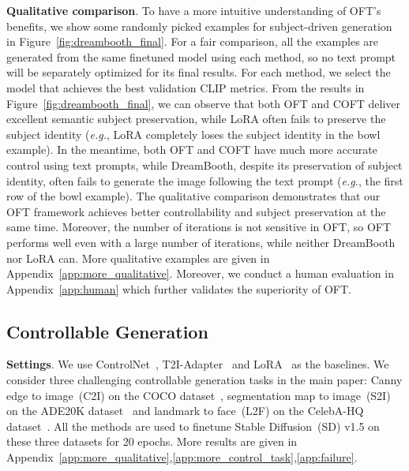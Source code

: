 \textbf{Qualitative comparison}. To have a more intuitive understanding of OFT's benefits, we show some randomly picked examples for subject-driven generation in Figure~\ref{fig:dreambooth_final}. For a fair comparison, all the examples are generated from the same finetuned model using each method, so no text prompt will be separately optimized for its final results. For each method, we select the model that achieves the best validation CLIP metrics. From the results in Figure~\ref{fig:dreambooth_final}, we can observe that both OFT and COFT deliver excellent semantic subject preservation, while LoRA often fails to preserve the subject identity (\emph{e.g.}, LoRA completely loses the subject identity in the bowl example). In the meantime, both OFT and COFT have much more accurate control using text prompts, while DreamBooth, despite its preservation of subject identity, often fails to generate the image following the text prompt (\emph{e.g.}, the first row of the bowl example). The qualitative comparison demonstrates that our OFT framework achieves better controllability and subject preservation at the same time. Moreover, the number of iterations is not sensitive in OFT, so OFT performs well even with a large number of iterations, while neither DreamBooth nor LoRA can. More qualitative examples are given in Appendix~\ref{app:more_qualitative}. Moreover, we conduct a human evaluation in Appendix~\ref{app:human} which further validates the superiority of OFT.

\subsection{Controllable Generation}

\textbf{Settings}. We use ControlNet~\cite{zhang2023adding}, T2I-Adapter~\cite{mou2023t2i} and LoRA~\cite{hulora2022} as the baselines. We consider three challenging controllable generation tasks in the main paper: Canny edge to image~(C2I) on the COCO dataset~\cite{lin2014microsoft}, segmentation map to image~(S2I) on the ADE20K dataset~\cite{zhou2017scene} and landmark to face~(L2F) on the CelebA-HQ dataset~\cite{karras2018progressive,xia2021tedigan}. All the methods are used to finetune Stable Diffusion~(SD) v1.5 on these three datasets for 20 epochs. More results are given in Appendix~\ref{app:more_qualitative},\ref{app:more_control_task},\ref{app:failure}.

